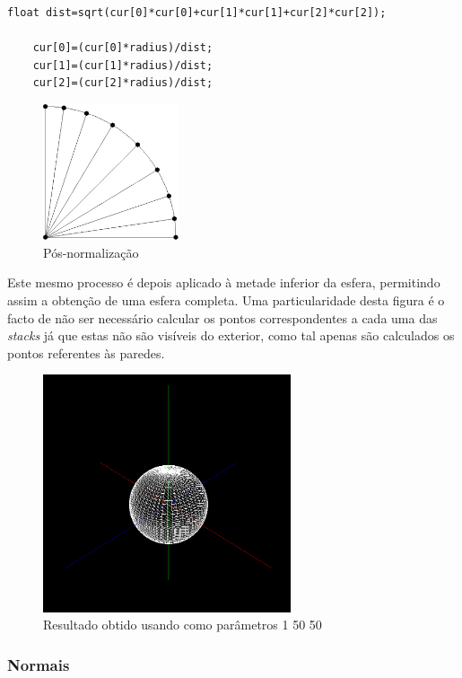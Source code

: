 \documentclass{article}
\begin{document}
\begin{Verbatim}[fontsize=\small]    
    float dist=sqrt(cur[0]*cur[0]+cur[1]*cur[1]+cur[2]*cur[2]);
      
    cur[0]=(cur[0]*radius)/dist;
    cur[1]=(cur[1]*radius)/dist;
    cur[2]=(cur[2]*radius)/dist;
\end{Verbatim}

\begin{figure}[H]
    \centering
    \includegraphics[height=4cm]{afterNorm.png}
    \caption{Pós-normalização}
\end{figure}

Este mesmo processo é depois aplicado à metade inferior da esfera, permitindo assim a obtenção de uma esfera completa. Uma particularidade desta figura é o facto de não ser necessário calcular os pontos correspondentes a cada uma das \textit{stacks} já que estas não são visíveis do exterior, como tal apenas são calculados os pontos referentes às paredes.

\begin{figure}[H]
    \centering
    \includegraphics[height=7cm]{sphereFinal.png}
    \caption{Resultado obtido usando como parâmetros 1 50 50}
\end{figure}

\subsubsection{Normais}
\end{document}
